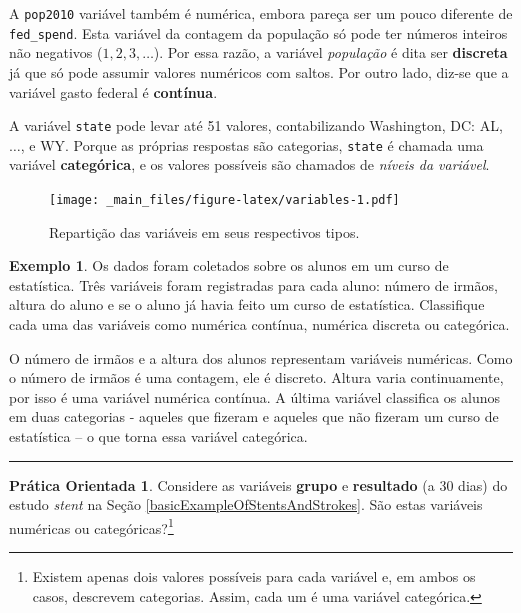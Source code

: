 \documentclass[
]{book}
\theoremstyle{definition}
\theoremstyle{definition}
\newtheorem{example}{Exemplo}[chapter]
\theoremstyle{definition}
\newtheorem{exercise}{Prática Orientada}[chapter]
\theoremstyle{definition}
\theoremstyle{remark}
\begin{document}
A \texttt{pop2010} variável também é numérica, embora pareça ser um pouco diferente de \texttt{fed\_spend}. Esta variável da contagem da população só pode ter números inteiros não negativos (\(1,2,3,\dots\)). Por essa razão, a variável \emph{população} é dita ser \textbf{discreta} já que só pode assumir valores numéricos com saltos. Por outro lado, diz-se que a variável gasto federal é \textbf{contínua}.

A variável \texttt{state} pode levar até 51 valores, contabilizando Washington, DC: AL,\(\dots\), e WY. Porque as próprias respostas são categorias, \texttt{state} é chamada uma variável \textbf{categórica}, e os valores possíveis são chamados de \emph{níveis da variável}.

\begin{figure}
\centering
\texttt{[image: \_main\_files/figure-latex/variables-1.pdf]}
\caption{\label{fig:variables}Repartição das variáveis em seus respectivos tipos.}
\end{figure}

\begin{example}
\protect\hypertarget{exm:unnamed-chunk-4}{}{\label{exm:unnamed-chunk-4} }Os dados foram coletados sobre os alunos em um curso de estatística. Três variáveis foram registradas para cada aluno: número de irmãos, altura do aluno e se o aluno já havia feito um curso de estatística. Classifique cada uma das variáveis como numérica contínua, numérica discreta ou categórica.
\end{example}

O número de irmãos e a altura dos alunos representam variáveis numéricas. Como o número de irmãos é uma contagem, ele é discreto. Altura varia continuamente, por isso é uma variável numérica contínua. A última variável classifica os alunos em duas categorias - aqueles que fizeram e aqueles que não fizeram um curso de estatística -- o que torna essa variável categórica.

\begin{center}\rule{0.5\linewidth}{0.5pt}\end{center}

\begin{exercise}
\protect\hypertarget{exr:unnamed-chunk-5}{}{\label{exr:unnamed-chunk-5} }Considere as variáveis \textbf{grupo} e \textbf{resultado} (a 30 dias) do estudo \emph{stent} na Seção \ref{basicExampleOfStentsAndStrokes}. São estas variáveis numéricas ou categóricas?\footnote{Existem apenas dois valores possíveis para cada variável e, em ambos os casos, descrevem categorias. Assim, cada um é uma variável categórica.}
\end{exercise}
\end{document}
